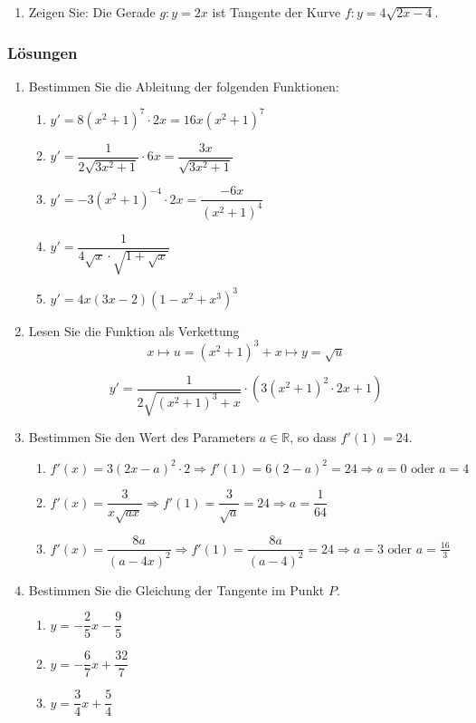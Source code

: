 \begin{enumerate}
    \item Zeigen Sie: Die Gerade \( g\colon y = 2x \) ist Tangente der Kurve \( f\colon y = 4 \sqrt{2x - 4} \).
\end{enumerate}

\clearpage
\subsubsection*{Lösungen}
\begin{enumerate}
    \item Bestimmen Sie die Ableitung der folgenden Funktionen:
          \begin{enumerate}
              \item \( y' = 8(x^2+1)^7 \cdot 2x = 16x(x^2+1)^7 \)
              \item \( y' = \dfrac{1}{2\sqrt{3x^2+1}} \cdot 6x = \dfrac{3x}{\sqrt{3x^2+1}} \)
              \item \( y' = -3(x^2+1)^{-4} \cdot 2x = \dfrac{-6x}{(x^2+1)^4} \)
              \item $y'=\dfrac{1}{4\sqrt{x}\cdot \sqrt{1+\sqrt{x}}}$
              \item $y'=4x(3x-2)(1-x^2+x^3)^3$
          \end{enumerate}

    \item Lesen Sie die Funktion als Verkettung
          $$ x \mapsto u = (x^2+1)^3+x \mapsto y = \sqrt{u}$$

          \[
              y' = \dfrac{1}{2\sqrt{(x^2+1)^3+x}} \cdot \left(3(x^2+1)^2 \cdot 2x + 1\right)
          \]

    \item Bestimmen Sie den Wert des Parameters \( a \in \mathbb{R} \), so dass \( f'(1) = 24 \).
          \begin{enumerate}
              \item \( f'(x) = 3(2x - a)^2 \cdot 2 \Rightarrow f'(1) = 6(2 - a)^2 = 24 \Rightarrow a = 0 \text{ oder } a = 4 \)
              \item \( f'(x) = \dfrac{3}{x\sqrt{ax}} \Rightarrow f'(1) = \dfrac{3}{\sqrt{a}} = 24 \Rightarrow a = \dfrac{1}{64} \)
              \item \( f'(x) = \dfrac{8a}{(a - 4x)^2} \Rightarrow f'(1) = \dfrac{8a}{(a - 4)^2} = 24 \Rightarrow a = 3 \text{ oder } a = \frac{16}{3} \)
          \end{enumerate}

    \item Bestimmen Sie die Gleichung der Tangente im Punkt \( P \).
          \begin{enumerate}
              \item \( y = -\dfrac{2}{5}x - \dfrac{9}{5} \)
              \item \( y = -\dfrac{6}{7}x + \dfrac{32}{7} \)
              \item \( y = \dfrac{3}{4}x + \dfrac{5}{4} \)
          \end{enumerate}


\end{enumerate}
